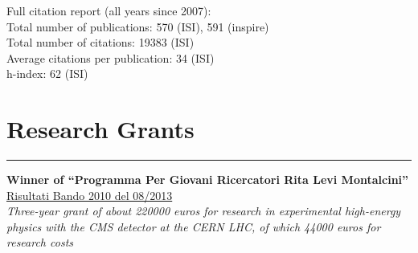 \documentclass[10pt, a4paper]{article}
\newcommand{\years}[1]{\marginnote{\hskip-0.2in{\small #1}}}
\begin{document}
Full citation report (all years since 2007):\\
Total number of publications: 570 (ISI), 591 (inspire) \\
Total number of citations: 19383 (ISI) \\
Average citations per publication: 34 (ISI) \\
h-index: 62 (ISI) 

\section*{Research Grants}
\vspace{-5pt}
\hrule
\vspace{10pt}
\years{03/2014}\textbf{Winner of ``Programma Per Giovani
  Ricercatori Rita Levi Montalcini''} \\ 
 \href{http://cervelli.cineca.it/ProgGiovRic/dm050813_683.pdf}{Risultati
   Bando 2010 del 08/2013} \\
\emph{Three-year grant of about 220000 euros for research in experimental high-energy
  physics with the CMS detector at the CERN LHC, of which 44000 euros for research costs}
\end{document}
